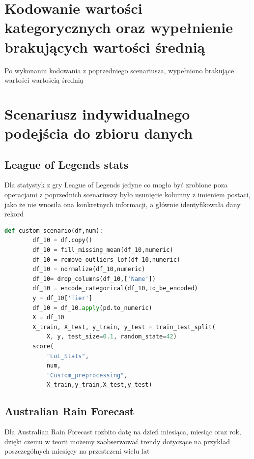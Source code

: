 \documentclass{book}
\begin{document}
\section{Kodowanie wartości kategorycznych oraz wypełnienie 
brakujących wartości średnią}
Po wykonaniu kodowania z poprzedniego scenariusza, 
wypełniono brakujące wartości wartością średnią
\section{Scenariusz indywidualnego podejścia do zbioru danych}
\subsection{League of Legends stats}
Dla statystyk z gry League of Legends jedyne co mogło być zrobione 
poza operacjami z poprzednich scenariuszy było usunięcie kolumny z 
imieniem postaci, jako że nie wnosiła ona konkretnych informacji, 
a głównie identyfikowała dany rekord

\begin{lstlisting}[language=Python, caption={Indywidualny 
    scenariusz dla zestawu danych LoL Stats}, captionpos=b]
    def custom_scenario(df,num):
        df_10 = df.copy()
        df_10 = fill_missing_mean(df_10,numeric)
        df_10 = remove_outliers_lof(df_10,numeric)
        df_10 = normalize(df_10,numeric)
        df_10= drop_columns(df_10,['Name'])
        df_10 = encode_categorical(df_10,to_be_encoded)
        y = df_10['Tier']
        df_10 = df_10.apply(pd.to_numeric)
        X = df_10
        X_train, X_test, y_train, y_test = train_test_split(
            X, y, test_size=0.1, random_state=42)
        score(
            "LoL_Stats",
            num,
            "Custom_preprocessing",
            X_train,y_train,X_test,y_test)
\end{lstlisting}

\subsection{Australian Rain Forecast}
Dla Australian Rain Forecast rozbito datę na dzień miesiąca, 
miesiąc oraz rok, dzięki czemu w teorii możemy zaobserwować 
trendy dotyczące na przykład poszczególnych miesięcy na przestrzeni 
wielu lat
\end{document}

